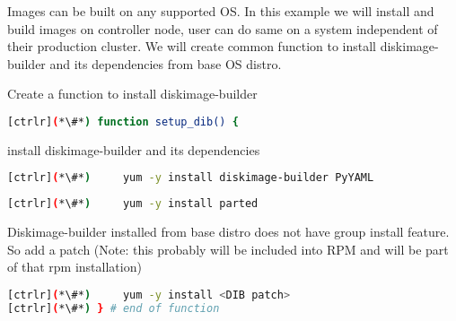 
Images can be built on any supported OS. In this example we will install and build images on controller node, user can do same on a system independent of their production cluster. We will create common function to install diskimage-builder and its dependencies from base OS distro.

Create a function to install diskimage-builder

\begin{lstlisting}[language=bash,keywords={}]
[ctrlr](*\#*) function setup_dib() {
\end{lstlisting}
install diskimage-builder and its dependencies
\begin{lstlisting}[language=bash,keywords={}]
[ctrlr](*\#*)     yum -y install diskimage-builder PyYAML

\end{lstlisting}

\begin{lstlisting}[language=bash,keywords={}]
[ctrlr](*\#*)     yum -y install parted
\end{lstlisting}

Diskimage-builder installed from base distro does not have group install feature. So add a patch (Note: this probably will be included into RPM and will be part of that rpm installation)

\begin{lstlisting}[language=bash,keywords={}]
[ctrlr](*\#*)     yum -y install <DIB patch>
[ctrlr](*\#*) } # end of function
\end{lstlisting}
